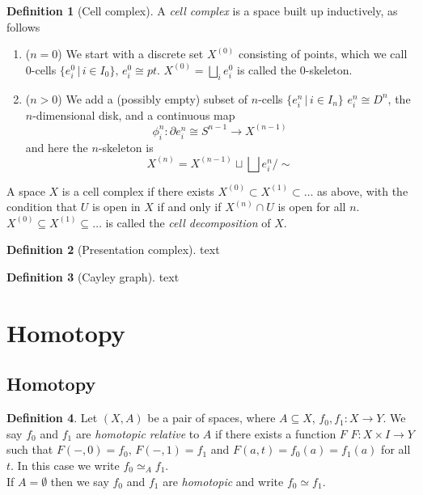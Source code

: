 \documentclass[a4paper,14pt]{extarticle}
\theoremstyle{definition}
\newtheorem*{definition}{Definition}
\begin{document}
\begin{definition}[Cell complex]
  A \emph{cell complex} is a space built up inductively, as follows
  \begin{enumerate}
    \item ($n=0$) We start with a discrete set $X^{(0)}$ consisting of points, which we call 
    $0$-cells $\{e_i^0\,|\,i\in I_0\}, \,e_i^0\cong pt$. $X^{(0)}=\bigsqcup_i e_i^0$ is called the $0$-skeleton.
    \item ($n>0$) We add a (possibly empty) subset of $n$-cells $\{e_i^n\,|\,i\in I_n\}$ 
    $e_i^n\cong D^n$, the $n$-dimensional disk, and a continuous map 
    \[\phi_i^n:\partial e_i^n\cong S^{n-1}\rightarrow X^{(n-1)}\] and here the $n$-skeleton 
    is \[X^{(n)}=X^{(n-1)}\sqcup\bigsqcup e_i^n/\sim\]
  \end{enumerate}
  A space $X$ is a cell complex if there exists $X^{(0)}\subset X^{(1)}\subset\ldots$ 
  as above, with the condition that $U$ is open in $X$ if and only if 
  $X^{(n)}\cap U$ is open for all $n$. \\

  $X^{(0)}\subseteq X^{(1)}\subseteq\ldots$ is called the \emph{cell decomposition} of $X$.
\end{definition}

\begin{definition}[Presentation complex]
  text
\end{definition}

\begin{definition}[Cayley graph]
  text
\end{definition}

\section{Homotopy}

\subsection{Homotopy}

\begin{definition}
  Let $(X,A)$ be a pair of spaces, where $A\subseteq X$, $f_0,f_1:X\rightarrow Y$. We say
  $f_0$ and $f_1$ are \emph{homotopic relative} to $A$ if there exists a function $F$ 
  $F:X\times I\rightarrow Y$ such that $F(-,0)=f_0, \,F(-,1)=f_1$ and $F(a,t)=f_0(a)=f_1(a)$ 
  for all $t$. In this case we write $f_0\simeq_A f_1$. \\

  If $A=\emptyset$ then we say $f_0$ and $f_1$ are \emph{homotopic} and write $f_0\simeq f_1$.
\end{definition}
\end{document}
